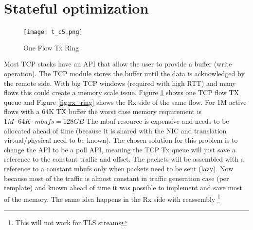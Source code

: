 \documentclass[conference]{IEEEtran}
\begin{document}

\section{Stateful optimization}

\begin{figure}[h]
  \texttt{[image: t\_c5.png]}
  \caption{One Flow Tx Ring}
  \label{fig:tx_ring}
\end{figure}

Most TCP stacks have an API that allow the user to provide a buffer (write operation). 
The TCP module stores the buffer until the data is acknowledged by the remote side. 
With big TCP windows (required with high RTT) and many flows this could create a memory scale issue. 
Figure \ref{fig:tx_ring} shows one TCP flow TX queue and Figure \ref{fig:rx_ring} shows the Rx side of the same flow. For 1M active flows with a 64K TX buffer 
the worst case memory requirement is $1M \cdot 64K \cdot  mbufs  = 128GB$
The mbuf resource is expensive and needs to be allocated ahead of time (because it is shared with the NIC and translation virtual/physical need to be known). 
The chosen solution for this problem is to change the API to be a poll API, 
meaning the TCP Tx queue will just save a reference to the constant traffic and offset. The packets will be assembled with a reference to a constant mbufs only when packets need to be sent (lazy). 
Now because most of the traffic is almost constant in traffic generation case (per template) and known ahead of time it was possible to implement and save most of the memory.
The same idea happens in the Rx side with reassembly \footnote{This will not work for TLS streams}
\end{document}
